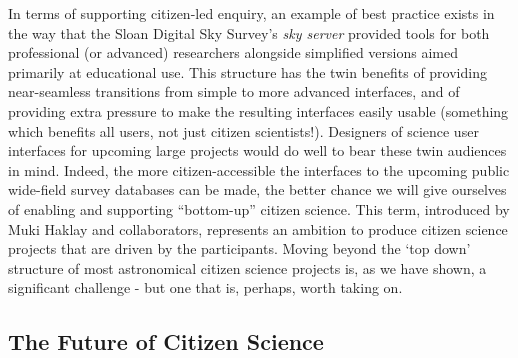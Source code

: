\documentclass{ar2e}
\begin{document}
In terms of supporting citizen-led enquiry, an example of best practice exists
in the way that the Sloan Digital Sky Survey's \textit{sky server} provided
tools for both professional (or advanced) researchers alongside simplified
versions aimed primarily at educational use. This structure has the twin
benefits of providing near-seamless transitions from simple to more advanced
interfaces, and of providing extra pressure to make the resulting interfaces
easily usable  (something which benefits all users, not just citizen
scientists!). Designers of science user interfaces for upcoming large projects
would do well to bear these twin audiences in mind. Indeed, the more
citizen-accessible the interfaces to the upcoming public wide-field survey
databases can be made, the better chance we will give ourselves of enabling and
supporting ``bottom-up'' citizen science.   This term, introduced by Muki Haklay
and collaborators, represents an ambition to produce citizen science projects
that are driven by the participants. Moving beyond the `top down' structure of
most astronomical citizen science projects is, as we have shown, a significant
challenge - but one that is, perhaps, worth taking on. 

 


\subsection{The Future of Citizen Science}
\end{document}

